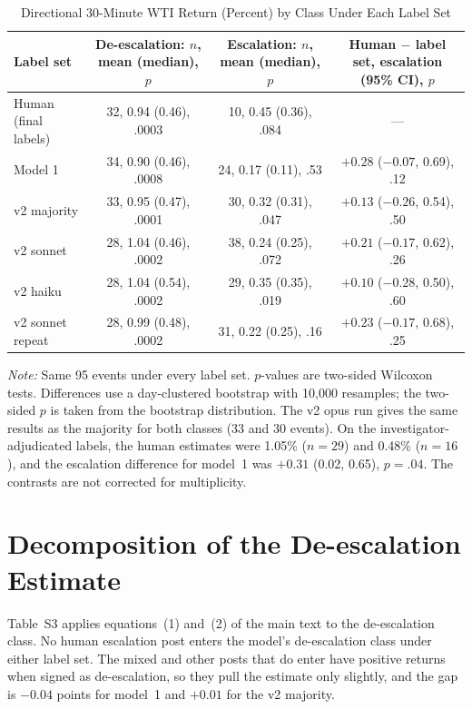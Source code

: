 \documentclass[11pt]{article}
\begin{document}
\begin{table}[h]
\centering
\small
\caption{Directional 30-Minute WTI Return (Percent) by Class Under Each Label Set}
\label{tab:labelsets}
\begin{tabular}{lccc}
\toprule
Label set & De-escalation: $n$, mean (median), $p$ & Escalation: $n$, mean (median), $p$ & Human $-$ label set, escalation (95\% CI), $p$ \\
\midrule
Human (final labels) & 32, 0.94 (0.46), .0003 & 10, 0.45 (0.36), .084 & --- \\
Model 1 & 34, 0.90 (0.46), .0008 & 24, 0.17 (0.11), .53 & $+0.28$ ($-0.07$, 0.69), .12 \\
v2 majority & 33, 0.95 (0.47), .0001 & 30, 0.32 (0.31), .047 & $+0.13$ ($-0.26$, 0.54), .50 \\
v2 sonnet & 28, 1.04 (0.46), .0002 & 38, 0.24 (0.25), .072 & $+0.21$ ($-0.17$, 0.62), .26 \\
v2 haiku & 28, 1.04 (0.54), .0002 & 29, 0.35 (0.35), .019 & $+0.10$ ($-0.28$, 0.50), .60 \\
v2 sonnet repeat & 28, 0.99 (0.48), .0002 & 31, 0.22 (0.25), .16 & $+0.23$ ($-0.17$, 0.68), .25 \\
\bottomrule
\end{tabular}

\vspace{0.5em}
\begin{minipage}{0.95\textwidth}
\footnotesize\textit{Note:} Same 95 events under every label set. $p$-values are two-sided Wilcoxon tests. Differences use a day-clustered bootstrap with 10,000 resamples; the two-sided $p$ is taken from the bootstrap distribution. The v2 opus run gives the same results as the majority for both classes (33 and 30 events). On the investigator-adjudicated labels, the human estimates were 1.05\% ($n = 29$) and 0.48\% ($n = 16$), and the escalation difference for model~1 was $+0.31$ (0.02, 0.65), $p = .04$. The contrasts are not corrected for multiplicity.
\end{minipage}
\end{table}

\section{Decomposition of the De-escalation Estimate}
\label{sec:decomp}

Table~S3 applies equations~(1) and~(2) of the main text to the de-escalation class. No human escalation post enters the model's de-escalation class under either label set. The mixed and other posts that do enter have positive returns when signed as de-escalation, so they pull the estimate only slightly, and the gap is $-0.04$ points for model~1 and $+0.01$ for the v2 majority.
\end{document}

